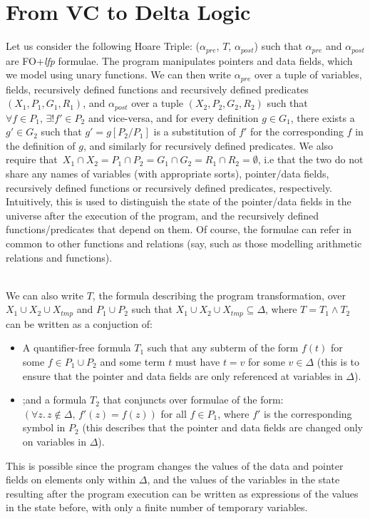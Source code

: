 	\section{From VC to Delta Logic}
Let us consider the following Hoare Triple: ($\alpha_{pre}$, $T$, $\alpha_{post}$) such that $\alpha_{pre}$ and $\alpha_{post}$ are FO+\textit{lfp} formulae. The program manipulates pointers and data fields, which we model using unary functions. We can then write $\alpha_{pre}$ over a tuple of variables, fields, recursively defined functions and recursively defined predicates $(X_1, P_1, G_1, R_1)$, and $\alpha_{post}$ over a tuple $(X_2, P_2, G_2, R_2)$ such that $\forall{} f \in{} P_1,\, \exists{}! f' \in{} P_2$ and vice-versa, and for every definition $g \in{} G_1$, there exists a $g' \in{} G_2$ such that $g' = g[P_2/P_1]$ is a substitution of $f'$ for the corresponding $f$ in the definition of $g$, and similarly for recursively defined predicates. We also require that $\, X_1 \cap{} X_2 = P_1 \cap{} P_2 = G_1 \cap{} G_2 = R_1 \cap{} R_2 = \emptyset{}$, i.e that the two do not share any names of variables (with appropriate sorts), pointer/data fields, recursively defined functions or recursively defined predicates, respectively. Intuitively, this is used to distinguish the state of the pointer/data fields in the universe after the execution of the program, and the recursively defined functions/predicates that depend on them. Of course, the formulae can refer in common to other functions and relations (say, such as those modelling arithmetic relations and functions). \\\

We can also write $T$, the formula describing the program transformation, over $X_1 \cup{} X_2 \cup{} X_{tmp}$ and $P_1 \cup{} P_2$ such that $X_1 \cup{} X_2 \cup{} X_{tmp} \subseteq{} \Delta$, where $T = T_1 \land{} T_2$ can be written as a conjuction of:\\
\begin{itemize}
\item A quantifier-free formula $T_1$ such that any subterm of the form $f(t)$ for some $f \in{} P_1 \cup{} P_2$ and some term $t$ must have $t = v$ for some $v \in{} \Delta{}$ (this is to ensure that the pointer and data fields are only referenced at variables in $\Delta{}$).\\
\item ;and a formula $T_2$ that conjuncts over formulae of the form: $\left(\forall{}z.\,z\notin{}\Delta{},\, f'(z) = f(z) \right)$ for all $f \in{} P_1$, where $f'$ is the corresponding symbol in $P_2$ (this describes that the pointer and data fields are changed only on variables in $\Delta$). \\
\end{itemize} 
This is possible since the program changes the values of the data and pointer fields on elements only within $\Delta$, and the values of the variables in the state resulting after the program execution can be written as expressions of the values in the state before, with only a finite number of temporary variables.\\\

